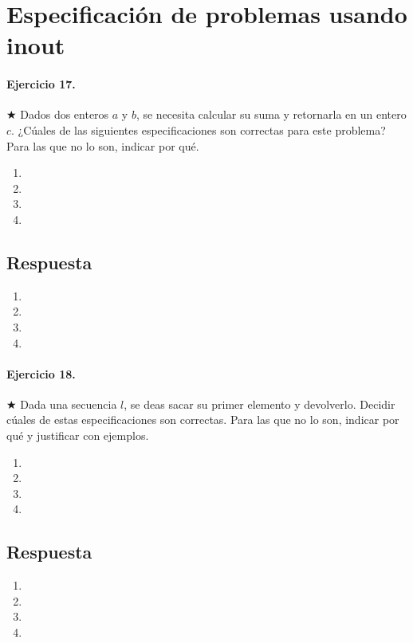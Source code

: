\documentclass[a4paper]{article}
\begin{document}
\section*{Especificación de problemas usando \textbf{inout}}

\paragraph*{Ejercicio 17.} $\bigstar$ Dados dos enteros $a$ y $b$, se necesita calcular su suma y retornarla en un entero $c$. ¿Cúales de las siguientes especificaciones son correctas para este problema? Para las que no lo son, indicar por qué. 
	\begin{enumerate}[label=\alph*)]
		\item
		\item
		\item
		\item
	\end{enumerate}
\subsection*{Respuesta}
	\begin{enumerate}[label=\alph*)]
		\item
		\item
		\item
		\item
	\end{enumerate}
	
\paragraph*{Ejercicio 18.}$\bigstar$ Dada una secuencia $l$, se deas sacar su primer elemento y devolverlo. Decidir cúales de estas especificaciones son correctas. Para las que no lo son, indicar por qué y justificar con ejemplos.
	\begin{enumerate}[label=\alph*)]
		\item
		\item
		\item
		\item
	\end{enumerate}
\subsection*{Respuesta}
	\begin{enumerate}[label=\alph*)]
		\item
		\item
		\item
		\item
	\end{enumerate}
\end{document}
